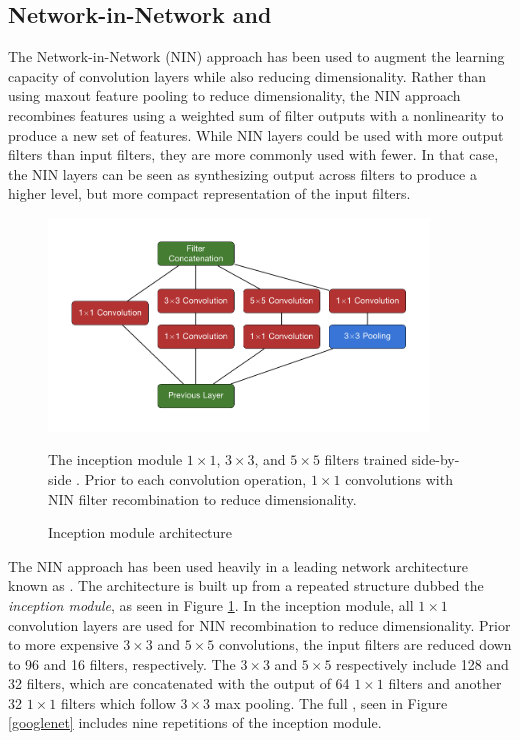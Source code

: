 \subsection{Network-in-Network and \googlenet}
\label{googlenet_section}

The Network-in-Network (NIN) \cite{lin2013network} approach has been used to augment the learning capacity of convolution layers while also reducing dimensionality.
Rather than using maxout feature pooling to reduce dimensionality, the NIN approach recombines features using a weighted sum of filter outputs with a \relu nonlinearity to produce a new set of features.
While NIN layers could be used with more output filters than input filters, they are more commonly used with fewer.
In that case, the NIN layers can be seen as synthesizing output across filters to produce a higher level, but more compact representation of the input filters.

\begin{figure}
\begin{center}
\includegraphics[width=0.9\textwidth]{figures/figures/inception/inception.pdf}
\end{center}

\caption{Inception module architecture}{
The inception module $1\times1$, $3\times3$, and $5\times5$ filters trained
side-by-side \cite{szegedy2014going}.
Prior to each convolution operation, $1\times1$ convolutions with NIN filter recombination to reduce dimensionality.}
\label{inception}
\end{figure}


The NIN approach has been used heavily in a leading network architecture known as \googlenet \cite{szegedy2014going}.
The \googlenet architecture is built up from a repeated structure dubbed the \textit{inception module}, as seen in Figure \ref{inception}.
In the inception module, all $1\times1$ convolution layers are used for NIN recombination to reduce dimensionality.
Prior to more expensive $3\times3$ and $5\times5$ convolutions, the input filters are reduced down to 96 and 16 filters, respectively.
The $3\times3$ and $5\times5$ respectively include 128 and 32 filters, which are concatenated with the output of 64 $1\times1$ filters and another 32 $1\times1$ filters which follow $3\times3$ max pooling.  The full \googlenet, seen in Figure \ref{googlenet} includes nine repetitions of the inception module.


